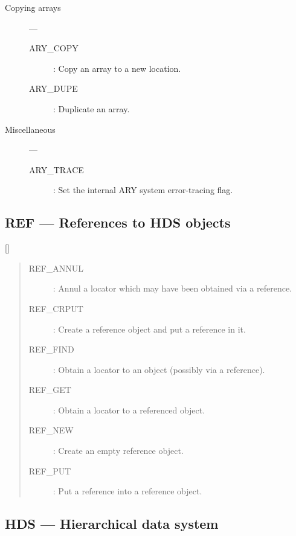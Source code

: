\begin{description}
\item [Copying arrays] ---

\begin{description}
\item [ARY\_COPY] : Copy an array to a new location.
\item [ARY\_DUPE] : Duplicate an array.
\end{description}

\item [Miscellaneous] ---

\begin{description}
\item [ARY\_TRACE] : Set the internal ARY system error-tracing flag.
\end{description}

\end{description}

\newpage

\subsection{REF --- References to HDS objects} 
\label{R_REF}

\vspace{-9mm}

\hfill []

\vspace{2mm}

\begin{quote}
\begin{description}
\item [REF\_ANNUL] : Annul a locator which may have been obtained via a reference.
\item [REF\_CRPUT] : Create a reference object and put a reference in it.
\item [REF\_FIND] : Obtain a locator to an object (possibly via a reference).
\item [REF\_GET] : Obtain a locator to a referenced object.
\item [REF\_NEW] : Create an empty reference object.
\item [REF\_PUT] : Put a reference into a reference object.
\end{description}
\end{quote}

\newpage

\subsection{HDS --- Hierarchical data system} 

